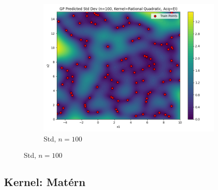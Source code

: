 \documentclass[a4paper,12pt]{article}
\begin{document}
\begin{figure}[H]
\begin{subfigure}{0.3\textwidth}
    \includegraphics[width=\linewidth]{Task-02/images/gp_std_rational_quadratic_n100_EI.png}
    \caption{Std, $n=100$}
\end{subfigure}
\end{figure}

\subsection*{Kernel: Matérn}
\end{document}
